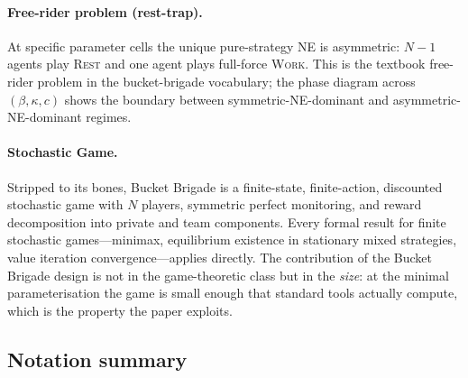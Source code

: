 \documentclass{anvil-paper}
\begin{document}
\paragraph{Free-rider problem (rest-trap).}
At specific parameter cells the unique pure-strategy NE is asymmetric:
$N{-}1$ agents play \textsc{Rest} and one agent plays full-force
\textsc{Work}. This is the textbook free-rider problem in the
bucket-brigade vocabulary; the phase diagram across $(\beta,\kappa,c)$
shows the boundary between symmetric-NE-dominant and
asymmetric-NE-dominant regimes.

\paragraph{Stochastic Game.}
Stripped to its bones, Bucket Brigade is a finite-state, finite-action,
discounted stochastic game with $N$ players, symmetric perfect
monitoring, and reward decomposition into private and team components.
Every formal result for finite stochastic games---minimax, equilibrium
existence in stationary mixed strategies, value iteration
convergence---applies directly. The contribution of the Bucket Brigade
design is not in the game-theoretic class but in the \emph{size}: at the
minimal parameterisation the game is small enough that standard tools
actually compute, which is the property the paper exploits.

\subsection{Notation summary}
\label{app:envspec:notation}
\end{document}
